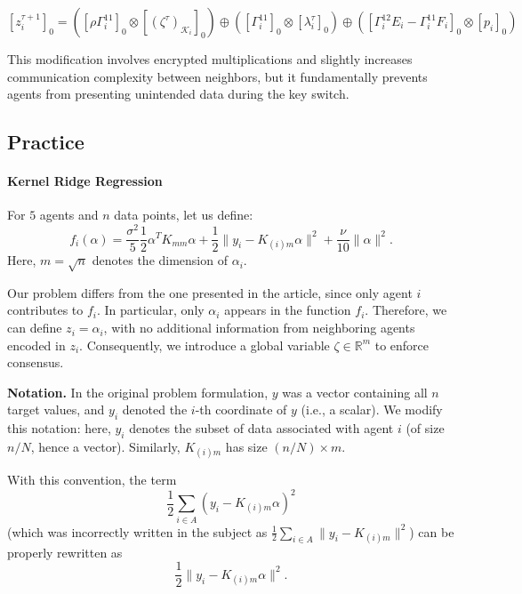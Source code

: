 \documentclass[10pt,english]{article}
\begin{document}
\begin{equation}\label{new first step}
[z_i^{\tau+1}]_0 = ([\rho\Gamma_i^{11}]_0 \otimes [(\zeta^\tau)_{\mathcal{K}_i}]_0) \oplus ([\Gamma_i^{11}]_0 \otimes [\lambda_i^\tau]_0) \oplus ([\Gamma_i^{12} E_i - \Gamma_i^{11} F_i]_0 \otimes [p_i]_0)
\end{equation}

This modification involves encrypted multiplications and slightly increases communication complexity between neighbors, but it fundamentally prevents agents from presenting unintended data during the key switch.

\subsection{Practice}
\label{sec:practice}


\paragraph{Kernel Ridge Regression} 
For $5$ agents and $n$ data points, let us define:
\begin{equation}
    f_i(\alpha)=\frac{\sigma^2}{5}\frac{1}{2}\alpha^T K_{mm}\alpha+\frac{1}{2}\lVert y_i-K_{(i)m}\alpha\rVert^2+\frac{\nu}{10}\lVert \alpha\rVert^2.
\end{equation}
Here, $m=\sqrt{n}$ denotes the dimension of $\alpha_i$.

Our problem differs from the one presented in the article, since only agent $i$ contributes to $f_i$. In particular, only $\alpha_i$ appears in the function $f_i$. Therefore, we can define $z_i = \alpha_i$, with no additional information from neighboring agents encoded in $z_i$. Consequently, we introduce a global variable $\zeta \in \mathbb{R}^m$ to enforce consensus.

\textbf{Notation.} In the original problem formulation, $y$ was a vector containing all $n$ target values, and $y_i$ denoted the $i$-th coordinate of $y$ (i.e., a scalar). We modify this notation: here, $y_i$ denotes the subset of data associated with agent $i$ (of size $n/N$, hence a vector). Similarly, $K_{(i)m}$ has size $(n/N)\times m$. 

With this convention, the term 
\[
\frac{1}{2}\sum_{i \in A} (y_i - K_{(i)m}\alpha)^2
\]
(which was incorrectly written in the subject as $\frac{1}{2}\displaystyle\sum_{i \in A}\lVert y_i-K_{(i)m}\rVert^2$) can be properly rewritten as
\[
\frac{1}{2}\lVert y_i-K_{(i)m}\alpha\rVert^2.
\]
\end{document}
